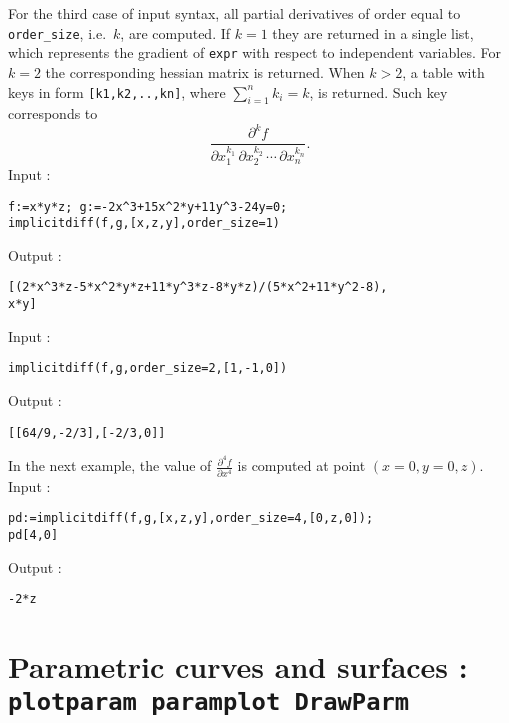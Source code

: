 \documentclass[a4paper,11pt]{book}
\begin{document}
For the third case of input syntax, all partial derivatives of order equal to {\tt order\_size}, i.e.~$ k $, are computed. If $ k=1 $ they are returned in a single list, which represents the gradient of {\tt expr} with respect to independent variables. For $ k=2 $ the corresponding hessian matrix is returned. When $ k>2 $, a table with keys in form {\tt [k1,k2,..,kn]}, where $ \sum_{i=1}^nk_i=k $, is returned. Such key corresponds to \[ \frac{\partial^k f}{\partial x_1^{k_1}\,\partial x_2^{k_2}\,\cdots\,\partial x_n^{k_n}}. \]
Input :
\begin{center}
{\tt f:=x*y*z; g:=-2x\verb|^|3+15x\verb|^|2*y+11y\verb|^|3-24y=0;}\\
{\tt implicitdiff(f,g,[x,z,y],order\_size=1)}
\end{center}
Output :
\begin{center}
{\tt [(2*x\verb|^|3*z-5*x\verb|^|2*y*z+11*y\verb|^|3*z-8*y*z)/(5*x\verb|^|2+11*y\verb|^|2-8),}\\
{\tt x*y]}
\end{center}
Input :
\begin{center}
{\tt implicitdiff(f,g,order\_size=2,[1,-1,0])}
\end{center}
Output :
\begin{center}
{\tt [[64/9,-2/3],[-2/3,0]]}
\end{center}
In the next example, the value of $ \frac{\partial^4 f}{\partial x^4} $ is computed at point $ (x=0,y=0,z) $.\\
Input :
\begin{center}
{\tt pd:=implicitdiff(f,g,[x,z,y],order\_size=4,[0,z,0]);}\\
{\tt pd[4,0]}
\end{center}
Output :
\begin{center}
{\tt -2*z}
\end{center}


\section{Parametric curves and surfaces : {\tt plotparam paramplot DrawParm}}
\end{document}
